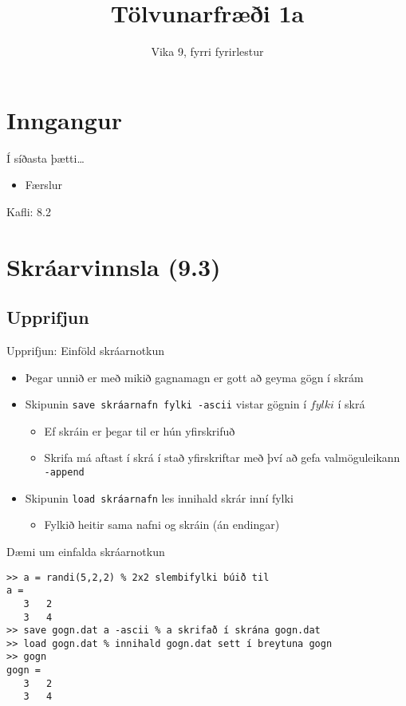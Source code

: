 \documentclass[handout]{beamer}
\title{Tölvunarfræði 1a}
\subtitle{Vika 9, fyrri fyrirlestur}
\begin{document}
\begin{frame}
\titlepage
\end{frame}

\section{Inngangur}

\begin{frame}{Í síðasta þætti\ldots}
\begin{itemize}
 \item Færslur
\end{itemize}
Kafli: 8.2
\end{frame}

\section{Skráarvinnsla (9.3)}

\subsection{Upprifjun}

\begin{frame}{Upprifjun: Einföld skráarnotkun}
\begin{itemize}
 \item Þegar unnið er með mikið gagnamagn er gott að geyma gögn í skrám
 \item Skipunin \texttt{save skráarnafn fylki -ascii} vistar gögnin í $fylki$ í skrá
 \begin{itemize}
  \item Ef skráin er þegar til er hún yfirskrifuð
  \item Skrifa má aftast í skrá í stað yfirskriftar með því að gefa valmöguleikann \texttt{-append}
 \end{itemize}
 \item Skipunin \texttt{load skráarnafn} les innihald skrár inní fylki
  \begin{itemize}
   \item Fylkið heitir sama nafni og skráin (án endingar)
  \end{itemize}
 \end{itemize}
\end{frame}

\begin{frame}[fragile]{Dæmi um einfalda skráarnotkun}
\begin{verbatim}
>> a = randi(5,2,2) % 2x2 slembifylki búið til
a =
   3   2
   3   4
>> save gogn.dat a -ascii % a skrifað í skrána gogn.dat
>> load gogn.dat % innihald gogn.dat sett í breytuna gogn
>> gogn
gogn =
   3   2
   3   4
\end{verbatim}
\end{frame}
\end{document}
